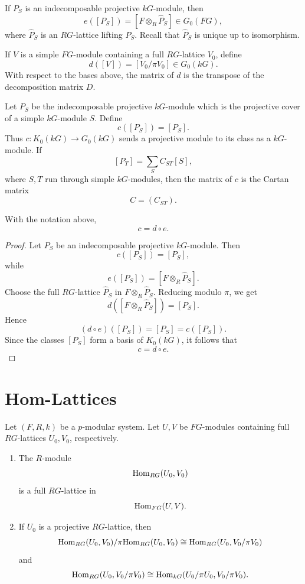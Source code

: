 If \(P_S\) is an indecomposable projective \(kG\)-module, then
\[
e([P_S])=\left[F\otimes_R \widehat P_S\right]\in G_0(FG),
\]
where \(\widehat P_S\) is an \(RG\)-lattice lifting \(P_S\). Recall that \(\widehat P_S\)
is unique up to isomorphism.

If \(V\) is a simple \(FG\)-module containing a full \(RG\)-lattice \(V_0\), define
\[
d([V])=[V_0/\pi V_0]\in G_0(kG).
\]
With respect to the bases above, the matrix of \(d\) is the transpose of the decomposition
matrix \(D\).

Let \(P_S\) be the indecomposable projective \(kG\)-module which is the projective cover
of a simple \(kG\)-module \(S\). Define
\[
c([P_S])=[P_S].
\]
Thus \(c:K_0(kG)\to G_0(kG)\) sends a projective module to its class as a \(kG\)-module.
If
\[
[P_T]=\sum_{S} C_{ST}[S],
\]
where \(S,T\) run through simple \(kG\)-modules, then the matrix of \(c\) is the Cartan
matrix
\[
C=(C_{ST}).
\]

\begin{theorem}
With the notation above,
\[
c=d\circ e.
\]
\end{theorem}

\begin{proof}
Let \(P_S\) be an indecomposable projective \(kG\)-module. Then
\[
c([P_S])=[P_S],
\]
while
\[
e([P_S])=\left[F\otimes_R \widehat P_S\right].
\]
Choose the full \(RG\)-lattice \(\widehat P_S\) in \(F\otimes_R\widehat P_S\).
Reducing modulo \(\pi\), we get
\[
d\left(\left[F\otimes_R \widehat P_S\right]\right)=[P_S].
\]
Hence
\[
(d\circ e)([P_S])=[P_S]=c([P_S]).
\]
Since the classes \([P_S]\) form a basis of \(K_0(kG)\), it follows that
\[
c=d\circ e.
\]
\end{proof}

\section{Hom-Lattices}

\begin{proposition}
Let \((F,R,k)\) be a \(p\)-modular system. Let \(U,V\) be \(FG\)-modules containing full
\(RG\)-lattices \(U_0,V_0\), respectively.

\begin{enumerate}
\item The \(R\)-module
\[
\mathrm{Hom}_{RG}(U_0,V_0)
\]
is a full \(RG\)-lattice in
\[
\mathrm{Hom}_{FG}(U,V).
\]

\item If \(U_0\) is a projective \(RG\)-lattice, then
\[
\mathrm{Hom}_{RG}(U_0,V_0)/\pi \mathrm{Hom}_{RG}(U_0,V_0)
\cong
\mathrm{Hom}_{RG}(U_0,V_0/\pi V_0)
\]
and
\[
\mathrm{Hom}_{RG}(U_0,V_0/\pi V_0)
\cong
\mathrm{Hom}_{kG}(U_0/\pi U_0,V_0/\pi V_0).
\]
\end{enumerate}
\end{proposition}

